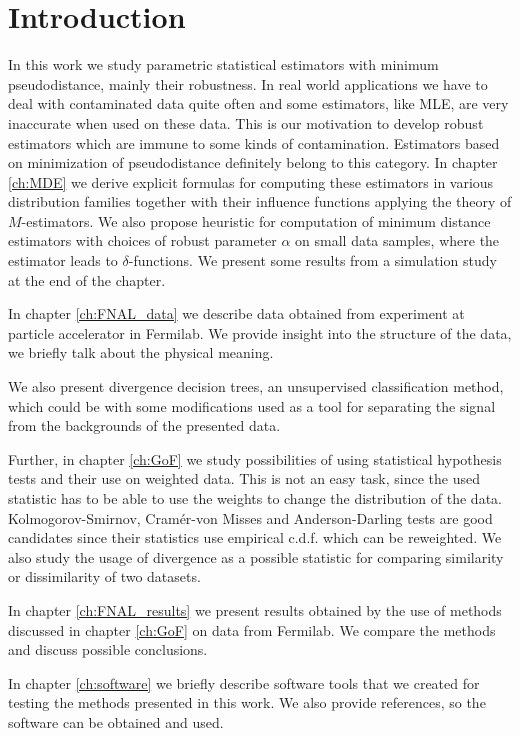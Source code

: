 \chapter*{Introduction} \label{ch:intro}

In this work we study parametric statistical estimators with minimum \ren pseudodistance, mainly their robustness. In real world applications we have to deal with contaminated data quite often and some estimators, like MLE, are very inaccurate when used on these data. This is our motivation to develop robust estimators which are immune to some kinds of contamination. Estimators based on minimization of \ren pseudodistance definitely belong to this category. In chapter \ref{ch:MDE} we derive explicit formulas for computing these estimators in various distribution families together with their influence functions applying the theory of $M$-estimators. We also propose heuristic for computation of minimum \ren distance estimators with choices of robust parameter $\alpha$ on small data samples, where the estimator leads to $\delta$-functions. We present some results from a simulation study at the end of the chapter.

In chapter \ref{ch:FNAL_data} we describe data obtained from experiment \dzero at particle accelerator in Fermilab. We provide insight into the structure of the data, we briefly talk about the physical meaning. 

We also present divergence decision trees, an unsupervised classification method, which could be with some modifications used as a tool for separating the signal from the backgrounds of the presented data.

Further, in chapter \ref{ch:GoF} we study possibilities of using statistical hypothesis tests and their use on weighted data. This is not an easy task, since the used statistic has to be able to use the weights to change the distribution of the data. Kolmogorov-Smirnov, Cram\'er-von Misses and Anderson-Darling tests are good candidates since their statistics use empirical c.d.f. which can be reweighted. We also study the usage of \ren divergence as a possible statistic for comparing similarity or dissimilarity of two datasets.

In chapter \ref{ch:FNAL_results} we present results obtained by the use of methods discussed in chapter \ref{ch:GoF} on data from Fermilab. We compare the methods and discuss possible conclusions.

In chapter \ref{ch:software} we briefly describe software tools that we  created for testing the methods presented in this work. We also provide references, so the software can be obtained and used. 


